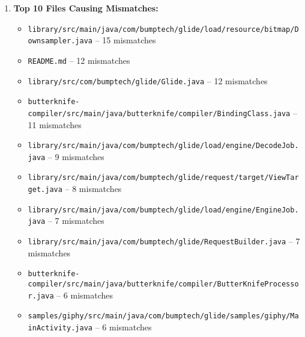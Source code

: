 \documentclass[12pt, a4paper]{report}
\begin{document}
\begin{enumerate}
    \item \textbf{Top 10 Files Causing Mismatches:}  
        \begin{itemize}
            \item \texttt{library/src/main/java/com/bumptech/glide/load/resource/bitmap/Downsampler.java} -- 15 mismatches  
            \item \texttt{README.md} -- 12 mismatches  
            \item \texttt{library/src/com/bumptech/glide/Glide.java} -- 12 mismatches  
            \item \texttt{butterknife-compiler/src/main/java/butterknife/compiler/BindingClass.java} -- 11 mismatches  
            \item \texttt{library/src/main/java/com/bumptech/glide/load/engine/DecodeJob.java} -- 9 mismatches  
            \item \texttt{library/src/main/java/com/bumptech/glide/request/target/ViewTarget.java} -- 8 mismatches  
            \item \texttt{library/src/main/java/com/bumptech/glide/load/engine/EngineJob.java} -- 7 mismatches  
            \item \texttt{library/src/main/java/com/bumptech/glide/RequestBuilder.java} -- 7 mismatches  
            \item \texttt{butterknife-compiler/src/main/java/butterknife/compiler/ButterKnifeProcessor.java} -- 6 mismatches  
            \item \texttt{samples/giphy/src/main/java/com/bumptech/glide/samples/giphy/MainActivity.java} -- 6 mismatches    
        \end{itemize}


\end{enumerate}
\end{document}
